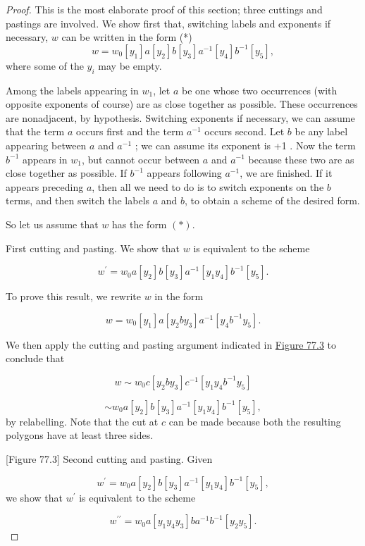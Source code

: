 \begin{proof}
	This is the most elaborate proof of this section; three cuttings and pastings are involved. We show first that, switching labels and exponents if necessary, \(w\) can be written in the form
(*)
\[
w = w_{0}[ y_{1}] a[ y_{2}] b[ y_{3}] a^{-1}[ y_{4}] b^{-1}[ y_{5}] ,
\]
where some of the \(y_{i}\) may be empty.

Among the labels appearing in \(w_{1}\), let \(a\) be one whose two occurrences (with opposite exponents of course) are as close together as possible. These occurrences are nonadjacent, by hypothesis. Switching exponents if necessary, we can assume that the term \(a\) occurs first and the term \(a^{-1}\) occurs second. Let \(b\) be any label appearing between \(a\) and \(a^{-1}\) ; we can assume its exponent is +1 . Now the term \(b^{-1}\) appears in \(w_{1}\), but cannot occur between \(a\) and \(a^{-1}\) because these two are as close together as possible. If \(b^{-1}\) appears following \(a^{-1}\), we are finished. If it appears preceding \(a\), then all we need to do is to switch exponents on the \(b\) terms, and then switch the labels \(a\) and \(b\), to obtain a scheme of the desired form.

So let us assume that \(w\) has the form \(( *)\).

First cutting and pasting. We show that \(w\) is equivalent to the scheme

\[
w^{\prime } = w_{0}a[ y_{2}] b[ y_{3}] a^{-1}[ {y_{1}y_{4}}] b^{-1}[ y_{5}] .
\]

To prove this result, we rewrite \(w\) in the form

\[
w = w_{0}[ y_{1}] a[ {y_{2}by_{3}}] a^{-1}[ {y_{4}b^{-1}y_{5}}] .
\]

We then apply the cutting and pasting argument indicated in \hyperref[fig:77.3]{Figure 77.3} to conclude that

\[
w \sim {w}_{0}c[ {y_{2}by_{3}}] c^{-1}[ {y_{1}y_{4}b^{-1}y_{5}}]
\]

\[
\sim {w}_{0}a[ y_{2}] b[ y_{3}] a^{-1}[ {y_{1}y_{4}}] b^{-1}[ y_{5}] ,
\]
by relabelling. Note that the cut at \(c\) can be made because both the resulting polygons have at least three sides.

[Figure 77.3]
Second cutting and pasting. Given

\[
w^{\prime } = w_{0}a[ y_{2}] b[ y_{3}] a^{-1}[ {y_{1}y_{4}}] b^{-1}[ y_{5}] ,
\]
we show that \(w^{\prime }\) is equivalent to the scheme

\[
w^{\prime \prime } = w_{0}a[ {y_{1}y_{4}y_{3}}] ba^{-1}b^{-1}[ {y_{2}y_{5}}] .
\]


\end{proof}
